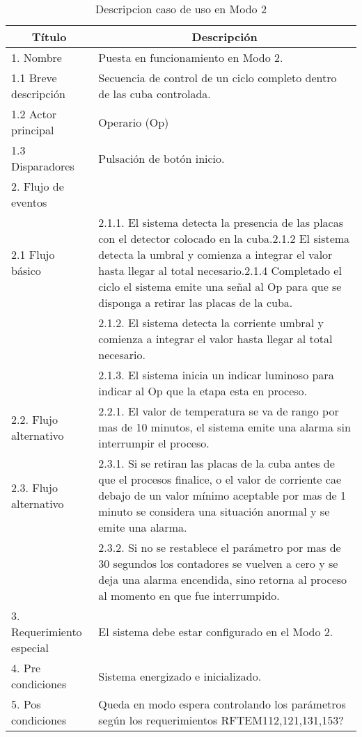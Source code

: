 \begin{table}[h!]
\begin{flushleft}
\begin{tabular}{|m{3cm}|m{11cm}|}
\hline
\multicolumn{1}{|c|}{\textbf{Título}} & \multicolumn{1}{c|}{\textbf{Descripción}} \\ \hline
1. Nombre & Puesta en funcionamiento en Modo 2. \\ \hline
1.1 Breve descripción  & Secuencia de control de un ciclo completo dentro de las cuba controlada. \\ \hline
1.2 Actor principal  & Operario (Op) \\ \hline
1.3 Disparadores  & Pulsación de botón inicio. \\ \hline
2. Flujo de eventos &  \\ \hline
\multicolumn{ 1}{|l|}{2.1 Flujo básico} & 2.1.1. El sistema detecta la presencia de las placas con el detector colocado en la cuba.2.1.2  El sistema detecta la  umbral y comienza a integrar el valor hasta llegar al total necesario.2.1.4  Completado el ciclo el sistema emite una señal al Op para que se disponga a retirar las placas de la cuba. \\ \cline{ 2- 2}
\multicolumn{ 1}{|l|}{} & 2.1.2. El sistema detecta la corriente umbral y comienza a integrar el valor hasta llegar al total necesario. \\ \cline{ 2- 2}
\multicolumn{ 1}{|l|}{} & 2.1.3. El sistema inicia un indicar luminoso para indicar al Op que la etapa esta en proceso. \\ \hline
\multicolumn{ 1}{|l|}{2.2. Flujo alternativo} & 2.2.1. El valor de temperatura se va de rango por mas de 10 minutos, el sistema emite una alarma sin interrumpir el proceso. \\ \hline
\multicolumn{ 1}{|l|}{2.3. Flujo alternativo} & 2.3.1. Si se retiran las placas de la cuba antes de que el procesos finalice, o el valor de corriente cae debajo de un valor mínimo aceptable por mas de 1 minuto se considera una situación anormal y se emite una alarma.  \\ \cline{ 2- 2}
\multicolumn{ 1}{|l|}{} & 
2.3.2. Si no se restablece el parámetro por mas de 30 segundos los contadores se vuelven a cero y se deja una alarma encendida, sino retorna al proceso al momento en que fue interrumpido. \\ \hline
3. Requerimiento especial & El sistema debe estar configurado en el Modo 2.\\ \hline
4. Pre condiciones  & Sistema energizado e inicializado.  \\ \hline
5. Pos condiciones & Queda en modo espera controlando los parámetros según los requerimientos RFTEM112,121,131,153? \\ \hline
\end{tabular}
\end{flushleft}
\caption{Descripcion caso de uso en Modo 2}
\label{caso_uso_func_2}
\end{table}


